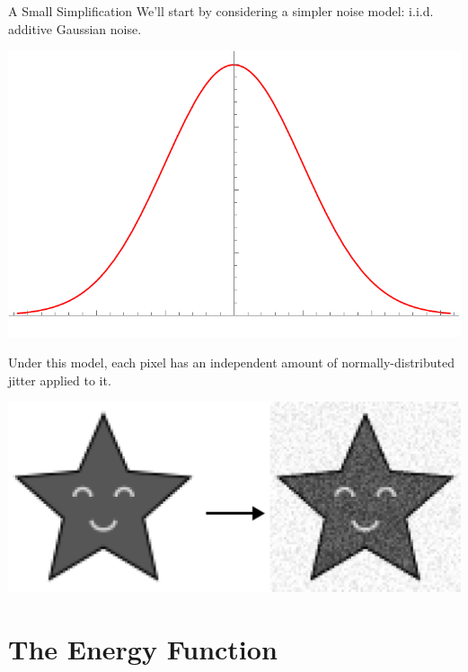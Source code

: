 \documentclass[10pt]{beamer}
\begin{document}
\begin{frame}{A Small Simplification}
We'll start by considering a simpler noise model: i.i.d. additive Gaussian noise.
\begin{center}
\includegraphics[scale=0.24]{img/normal}
\end{center}
Under this model, each pixel has an independent amount of normally-distributed jitter applied to it.
\begin{center}
\includegraphics[scale=0.3]{img/yields-gaussian}
\end{center}
\end{frame}



\section{The Energy Function}
\end{document}
